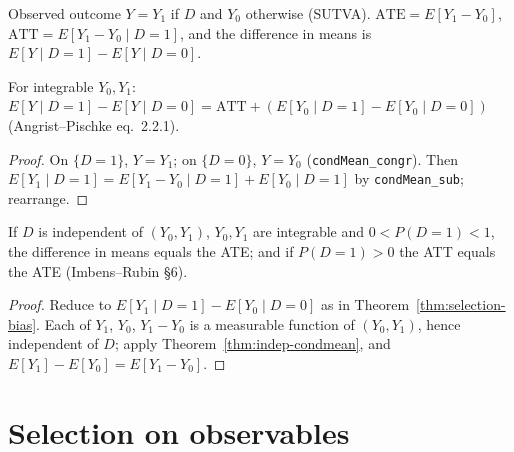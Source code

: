 \begin{definition}
\label{def:potential-outcomes}
\leanok
{}
Observed outcome $Y = Y_1$ if $D$ and $Y_0$ otherwise (SUTVA). $\mathrm{ATE} = E[Y_1 - Y_0]$,
$\mathrm{ATT} = E[Y_1 - Y_0 \mid D = 1]$, and the difference in means is $E[Y\mid D=1] - E[Y \mid D = 0]$.
\end{definition}

\begin{theorem}
\label{thm:selection-bias}
\leanok
{}
For integrable $Y_0, Y_1$: $E[Y\mid D=1] - E[Y\mid D=0] = \mathrm{ATT} + (E[Y_0\mid D=1] - E[Y_0\mid D=0])$
(Angrist--Pischke eq.~2.2.1).
\end{theorem}
\begin{proof}
\leanok
{}
On $\{D = 1\}$, $Y = Y_1$; on $\{D = 0\}$, $Y = Y_0$ (\texttt{condMean\_congr}). Then
$E[Y_1 \mid D=1] = E[Y_1 - Y_0 \mid D = 1] + E[Y_0 \mid D = 1]$ by \texttt{condMean\_sub}; rearrange.
\end{proof}

\begin{theorem}
\label{thm:randomization}
\leanok
{}
If $D$ is independent of $(Y_0, Y_1)$, $Y_0, Y_1$ are integrable and $0 < P(D=1) < 1$, the difference in means
equals the ATE; and if $P(D=1)>0$ the ATT equals the ATE (Imbens--Rubin \S6).
\end{theorem}
\begin{proof}
\leanok
{}
Reduce to $E[Y_1 \mid D = 1] - E[Y_0 \mid D = 0]$ as in Theorem~\ref{thm:selection-bias}. Each of $Y_1$, $Y_0$,
$Y_1 - Y_0$ is a measurable function of $(Y_0, Y_1)$, hence independent of $D$; apply
Theorem~\ref{thm:indep-condmean}, and $E[Y_1] - E[Y_0] = E[Y_1 - Y_0]$.
\end{proof}

\section{Selection on observables}
\label{sec:unconfoundedness}

